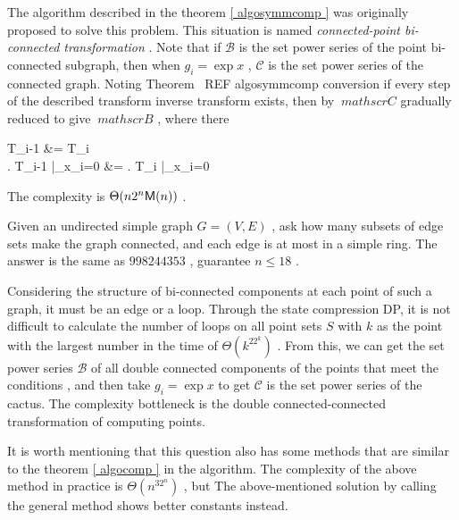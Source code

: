 The algorithm described in the theorem \ref { algosymmcomp } was originally proposed to solve this problem. This situation is named \emph { connected-point bi-connected transformation }. Note that if $ \mathscr B $ is the set power series of the point bi-connected subgraph, then when $ g_i = \exp x $ , $ \mathscr C $ is the set power series of the connected graph. Noting Theorem \ REF { algosymmcomp } conversion if every step of the described transform inverse transform exists, then by $ \ mathscr C $ gradually reduced to give $ \ mathscr B $ , where there
\begin { align* }
 \mathscr T_{i-1} &= \ln  \circ  {} \mathscr T_i \\
\left . \mathscr T_{i-1} \right |_{x_i=0} &= \left . \mathscr T_i \right |_{x_i=0}
\end { align* }
The complexity is $ \Theta (n 2 ^n  \mathsf M (n)) $ .

\begin { problem }
Given an undirected simple graph $ G=(V,E) $ , ask how many subsets of edge sets make the graph connected, and each edge is at most in a simple ring. The answer is the same as $ 998244353 $ , guarantee $ n \le  18 $ .
\end { problem }

\begin { solution }
Considering the structure of bi-connected components at each point of such a graph, it must be an edge or a loop. Through the state compression DP, it is not difficult to calculate the number of loops on all point sets $ S $ with $ k $ as the point with the largest number in the time of $ \Theta (k^ 22 ^k) $ . From this, we can get the set power series $ \mathscr B $ of all double connected components of the points that meet the conditions , and then take $ g_i = \exp x $ to get $ \mathscr C $ is the set power series of the cactus. The complexity bottleneck is the double connected-connected transformation of computing points.
\end { solution }

It is worth mentioning that this question also has some methods that are similar to the theorem \ref { algocomp } in the algorithm. The complexity of the above method in practice is $ \Theta (n^ 32 ^n) $ , but The above-mentioned solution by calling the general method shows better constants instead.

